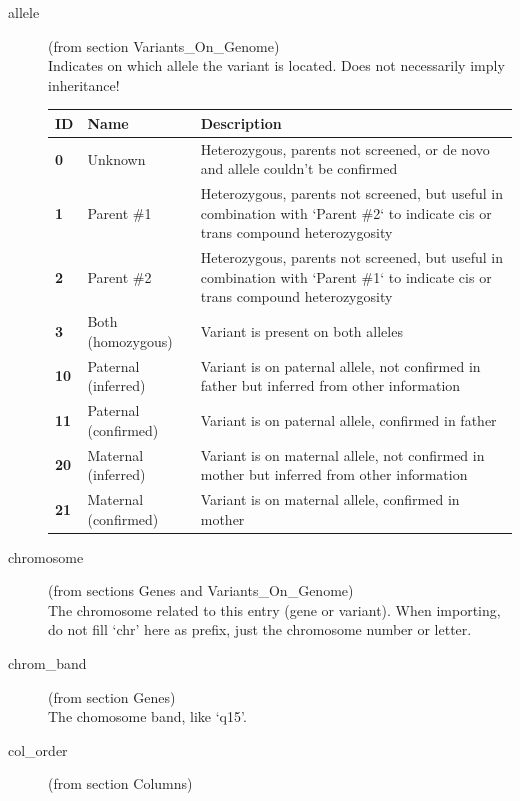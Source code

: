 \documentclass[a4paper,oneside,openany,12pt]{memoir}
\begin{document}
\begin{description}
  \item[allele] (from section Variants\_On\_Genome)\hfill \\
  Indicates on which allele the variant is located.
  Does not necessarily imply inheritance!\\
  \begin{tabular}{>{\bfseries}p{0.6cm} p{4.0cm} p{10.0cm}}
    ID & \textbf{Name} & \textbf{Description}\\ \hline \hline
    0 & Unknown & Heterozygous, parents not screened, or de novo and allele couldn't be confirmed\\ \hline
    1 & Parent \#1 & Heterozygous, parents not screened, but useful in combination with `Parent \#2` to indicate cis or
      trans compound heterozygosity\\ \hline
    2 & Parent \#2 & Heterozygous, parents not screened, but useful in combination with `Parent \#1` to indicate cis or
      trans compound heterozygosity\\ \hline
    3 & Both (homozygous) & Variant is present on both alleles\\ \hline
    10 & Paternal (inferred) & Variant is on paternal allele, not confirmed in father but inferred from other
      information\\ \hline
    11 & Paternal (confirmed) & Variant is on paternal allele, confirmed in father\\ \hline
    20 & Maternal (inferred) & Variant is on maternal allele, not confirmed in mother but inferred from other
      information\\ \hline
    21 & Maternal (confirmed) & Variant is on maternal allele, confirmed in mother\\ \hline
  \end{tabular}
  \item[chromosome] (from sections Genes and Variants\_On\_Genome)\hfill \\
  The chromosome related to this entry (gene or variant).
  When importing, do not fill `chr' here as prefix, just the chromosome number or letter.
  \item[chrom\_band] (from section Genes)\hfill \\
  The chomosome band, like `q15'.
  \item[col\_order] (from section Columns)\hfill \\

\end{description}
\end{document}
